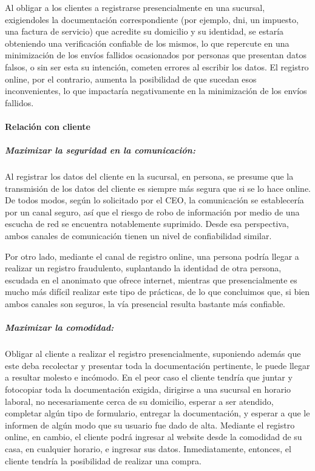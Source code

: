 Al obligar a los clientes a registrarse presencialmente en una sucursal,
exigiendoles la documentación correspondiente (por ejemplo, dni, un impuesto,
una factura de servicio) que acredite su domicilio y su identidad, se estaría
obteniendo una verificación confiable de los mismos, lo que repercute en una
minimización de los envíos fallidos ocasionados por personas que presentan
datos falsos, o sin ser esta su intención, cometen errores al escribir los
datos. El registro online, por el contrario, aumenta la posibilidad de que
sucedan esos inconvenientes, lo que impactaría negativamente en la
minimización de los envíos fallidos.

\paragraph{Relación con cliente}

\subparagraph{Maximizar la seguridad en la comunicación:}

Al registrar los datos del cliente en la sucursal, en persona, se presume que
la transmisión de los datos del cliente es siempre más segura que si se lo
hace online. De todos modos, según lo solicitado por el CEO, la comunicación
se establecería por un canal seguro, así que el riesgo de robo de información
por medio de una escucha de red se encuentra notablemente suprimido. Desde esa
perspectiva, ambos canales de comunicación tienen un nivel de confiabilidad
similar.

Por otro lado, mediante el canal de registro online, una persona podría llegar
a realizar un registro fraudulento, suplantando la identidad de otra persona,
escudada en el anonimato que ofrece internet, mientras que presencialmente es
mucho más difícil realizar este tipo de prácticas, de lo que concluimos que,
si bien ambos canales son seguros, la vía presencial resulta bastante más
confiable.

\subparagraph{Maximizar la comodidad:}

Obligar al cliente a realizar el registro presencialmente, suponiendo además
que este deba recolectar y presentar toda la documentación pertinente, le
puede llegar a resultar molesto e incómodo. En el peor caso el cliente tendría
que juntar y fotocopiar toda la documentación exigida, dirigirse a una
sucursal en horario laboral, no necesariamente cerca de su domicilio, esperar
a ser atendido, completar algún tipo de formulario, entregar la documentación,
y esperar a que le informen de algún modo que su usuario fue dado de alta.
Mediante el registro online, en cambio, el cliente podrá ingresar al website
desde la comodidad de su casa, en cualquier horario, e ingresar sus datos.
Inmediatamente, entonces, el cliente tendría la posibilidad de realizar una
compra.

